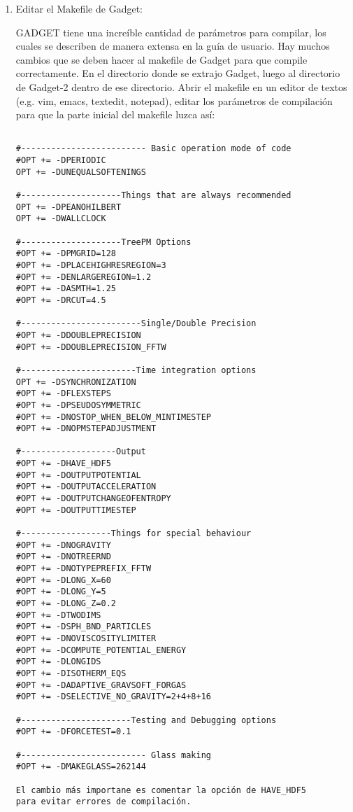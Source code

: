 \documentclass[a4paper,openright,12pt]{book}
\begin{document}
\begin{enumerate}
\item Editar el \textsf{Makefile} de Gadget:

GADGET tiene una increíble cantidad de parámetros para compilar, los cuales se describen de manera extensa en la guía de usuario. Hay muchos cambios que se deben hacer al \textsf{makefile} de Gadget para que compile correctamente.  En el directorio donde se extrajo Gadget, luego al directorio de \textsf{Gadget-2} dentro de ese directorio. Abrir el \textsf{makefile} en un editor de textos (e.g. \textsf{vim, emacs, textedit, notepad}), editar los parámetros de compilación para que la parte inicial del \textsf{makefile} luzca así:
\begin{verbatim}

#------------------------- Basic operation mode of code
#OPT += -DPERIODIC
OPT += -DUNEQUALSOFTENINGS

#--------------------Things that are always recommended
OPT += -DPEANOHILBERT
OPT += -DWALLCLOCK

#--------------------TreePM Options
#OPT += -DPMGRID=128
#OPT += -DPLACEHIGHRESREGION=3
#OPT += -DENLARGEREGION=1.2
#OPT += -DASMTH=1.25
#OPT += -DRCUT=4.5

#------------------------Single/Double Precision
#OPT += -DDOUBLEPRECISION
#OPT += -DDOUBLEPRECISION_FFTW

#-----------------------Time integration options
OPT += -DSYNCHRONIZATION
#OPT += -DFLEXSTEPS
#OPT += -DPSEUDOSYMMETRIC
#OPT += -DNOSTOP_WHEN_BELOW_MINTIMESTEP
#OPT += -DNOPMSTEPADJUSTMENT

#-------------------Output
#OPT += -DHAVE_HDF5
#OPT += -DOUTPUTPOTENTIAL
#OPT += -DOUTPUTACCELERATION
#OPT += -DOUTPUTCHANGEOFENTROPY
#OPT += -DOUTPUTTIMESTEP

#------------------Things for special behaviour
#OPT += -DNOGRAVITY
#OPT += -DNOTREERND
#OPT += -DNOTYPEPREFIX_FFTW
#OPT += -DLONG_X=60
#OPT += -DLONG_Y=5
#OPT += -DLONG_Z=0.2
#OPT += -DTWODIMS
#OPT += -DSPH_BND_PARTICLES
#OPT += -DNOVISCOSITYLIMITER
#OPT += -DCOMPUTE_POTENTIAL_ENERGY
#OPT += -DLONGIDS
#OPT += -DISOTHERM_EQS
#OPT += -DADAPTIVE_GRAVSOFT_FORGAS
#OPT += -DSELECTIVE_NO_GRAVITY=2+4+8+16

#----------------------Testing and Debugging options
#OPT += -DFORCETEST=0.1

#------------------------- Glass making
#OPT += -DMAKEGLASS=262144

El cambio más importane es comentar la opción de HAVE_HDF5 
para evitar errores de compilación.


\end{verbatim}
\end{enumerate}
\end{document}
